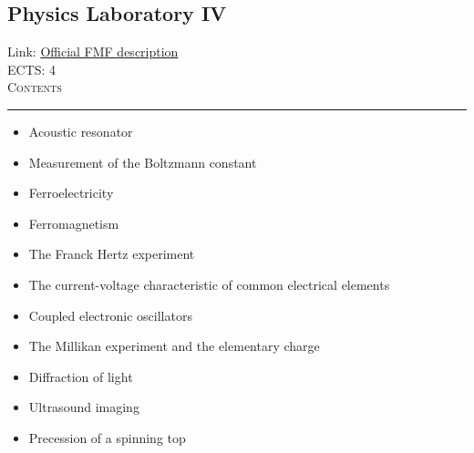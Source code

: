 \documentclass[11pt, a4paper]{article}
\newenvironment{course}[3]{
\subsection{#1}%
Link: \href{#2}{Official FMF description}\\%
ECTS: #3%
\vspace{1ex}
\\
{\large \textsc{Contents}}\\[-0.9ex]%
\rule{\textwidth}{0.5pt}
\vspace{-3ex}
}
{}
\newenvironment{chapter}[1]{
\begin{tcolorbox}[title=#1, breakable]
}
{\end{tcolorbox}}
\begin{document}
\begin{course}{Physics Laboratory IV}{https://www.fmf.uni-lj.si/en/study-physics/programmes/1fiz/2020/7000777/courses/1145/}{4}
    \label{physics_laboratory_4}

    \begin{chapter}{Experiments}
        \begin{itemize}
            
            \item Acoustic resonator

            \item Measurement of the Boltzmann constant

            \item Ferroelectricity

            \item Ferromagnetism

            \item The Franck Hertz experiment

            \item The current-voltage characteristic of common electrical elements

            \item Coupled electronic oscillators

            \item The Millikan experiment and the elementary charge

            \item Diffraction of light

            \item Ultrasound imaging

            \item Precession of a spinning top
            
        \end{itemize}
    \end{chapter}
\end{course}
\end{document}
